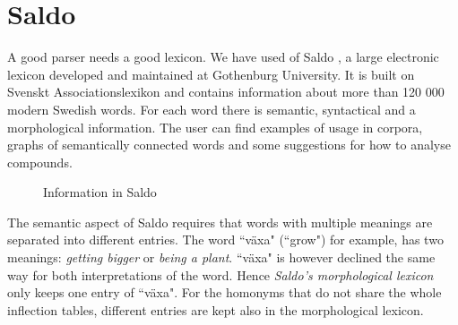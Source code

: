 \documentclass{report}
\begin{document}
\section{Saldo}
\label{sec:saldo}
A good parser needs a good lexicon. We have used of Saldo \cite{saldo}, a
large electronic lexicon developed and maintained at Gothenburg University. It is
built on Svenskt Associationslexikon and contains information about more than 
120 000 modern Swedish words.
For each word there is semantic, syntactical and a morphological
information. The user can find examples of usage in corpora,
graphs of semantically connected words and some suggestions for how to analyse compounds. \\
\begin{figure}[h!]
\centering
{}
\hspace{20mm}
\caption{Information in Saldo}
\label{fig:saldo}
\end{figure}

The semantic aspect of Saldo requires that words with multiple meanings are
separated into different entries.
The word ``växa" (``grow") for example, has two meanings: \emph{getting
bigger}
or \emph{being a plant}. 
``växa" is however declined the same way for both interpretations of the word.
Hence \textit{Saldo's morphological lexicon} only keeps one entry of ``växa".
For the homonyms that do not share the whole inflection tables, different entries are 
kept also in the morphological lexicon.
\end{document}
